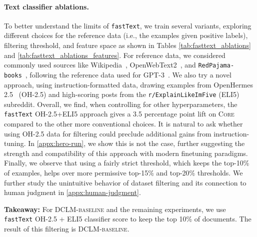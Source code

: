\paragraph{Text classifier ablations.} To better understand the limits of \texttt{fastText}, we train several variants, exploring different choices for the reference data (i.e., the examples given positive labels), filtering threshold, and feature space as shown in Tables \ref{tab:fasttext_ablations} and \ref{tab:fasttext_ablations_features}.
For reference data, we considered commonly used sources like Wikipedia~\citep{pile}, OpenWebText2~\citep{pile}, and \texttt{RedPajama}\texttt{-books}~\citep{rpj},
following the reference data used for GPT-3~\citep{gpt3}. We also try a novel approach, using instruction-formatted data, drawing examples from OpenHermes 2.5~\citep{openhermes} (\textsc{OH-2.5})
and high-scoring posts from the \texttt{r/ExplainLikeImFive} (ELI5) subreddit. Overall, we find, when controlling for other hyperparameters, the \texttt{fastText} \textsc{OH-2.5}+ELI5 approach gives a 3.5 percentage point lift on \textsc{Core} compared to the other more conventional choices. It is natural to ask whether using \textsc{OH-2.5} data for filtering could preclude additional gains from instruction-tuning. In \ref{appx:hero-run}, we show this is not the case, further suggesting the strength and compatibility of this approach with modern finetuning paradigms. Finally, we observe that using a fairly strict threshold, which keeps the top-10\% of examples, helps over more permissive top-15\% and top-20\% thresholds. We further study the unintuitive behavior of dataset filtering and its connection to human judgment in \ref{appx:human-judgment}.
\label{subsec:ablations}

\begin{tcolorbox}[
    colback=blue!10,
    colframe=blue!50, boxrule=0.5pt, arc=0mm, left=5pt, right=5pt, top=2pt, bottom=2pt,
    fontupper={\fontsize{9.5pt}{11.75pt}\selectfont}
  ]
    \textbf{Takeaway:} For \textsc{DCLM-baseline} and the remaining experiments, we use \texttt{fastText} \textsc{OH-2.5} + ELI5 classifier score to keep the top 10\% of documents. The result of this filtering is \textsc{DCLM-baseline}.
  \end{tcolorbox}

